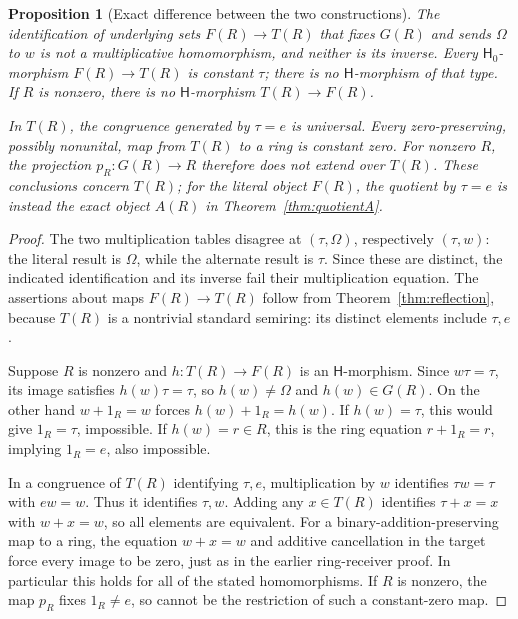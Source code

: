 \documentclass[11pt]{article}
\newtheorem{proposition}[theorem]{Proposition}
\theoremstyle{definition}
\newcommand{\HH}{\mathsf H}
\newcommand{\HHZ}{\mathsf H_0}
\newcommand{\Om}{\Omega}
\begin{document}
\begin{proposition}[Exact difference between the two constructions]
\label{prop:difference}
The identification of underlying sets
\(F(R)\to T(R)\) that fixes \(G(R)\) and sends \(\Om\) to \(w\)
is not a multiplicative homomorphism, and neither is its inverse.
Every \(\HHZ\)-morphism \(F(R)\to T(R)\) is constant \(\tau\);
there is no \(\HH\)-morphism of that type.
If \(R\) is nonzero, there is no \(\HH\)-morphism \(T(R)\to F(R)\).

In \(T(R)\), the congruence generated by \(\tau=e\) is universal.
Every zero-preserving, possibly nonunital, map from \(T(R)\) to a
ring is constant zero. For nonzero \(R\), the projection
\(p_R:G(R)\to R\) therefore does not extend over \(T(R)\).
These conclusions concern \(T(R)\); for the literal object \(F(R)\),
the quotient by \(\tau=e\) is instead the exact object \(A(R)\)
in Theorem~\ref{thm:quotientA}.
\end{proposition}
\begin{proof}
The two multiplication tables disagree at \((\tau,\Om)\), respectively
\((\tau,w)\): the literal result is \(\Om\), while the alternate
result is \(\tau\). Since these are distinct, the indicated
identification and its inverse fail their multiplication equation.
The assertions about maps \(F(R)\to T(R)\) follow from
Theorem~\ref{thm:reflection}, because \(T(R)\) is a nontrivial
standard semiring: its distinct elements include \(\tau,e\).

Suppose \(R\) is nonzero and \(h:T(R)\to F(R)\) is an
\(\HH\)-morphism. Since \(w\tau=\tau\), its image satisfies
\(h(w)\tau=\tau\), so \(h(w)\ne\Om\) and \(h(w)\in G(R)\).
On the other hand \(w+1_R=w\) forces
\(h(w)+1_R=h(w)\). If \(h(w)=\tau\), this would give
\(1_R=\tau\), impossible. If \(h(w)=r\in R\), this is the
ring equation \(r+1_R=r\), implying \(1_R=e\), also impossible.

In a congruence of \(T(R)\) identifying \(\tau,e\), multiplication
by \(w\) identifies \(\tau w=\tau\) with \(ew=w\). Thus it
identifies \(\tau,w\). Adding any \(x\in T(R)\) identifies
\(\tau+x=x\) with \(w+x=w\), so all elements are equivalent.
For a binary-addition-preserving map to a ring, the equation
\(w+x=w\) and additive cancellation in the target force every image
to be zero, just as in the earlier ring-receiver proof. In particular
this holds for all of the stated homomorphisms. If \(R\) is nonzero,
the map \(p_R\) fixes \(1_R\ne e\), so cannot be the restriction of
such a constant-zero map.
\end{proof}
\end{document}
